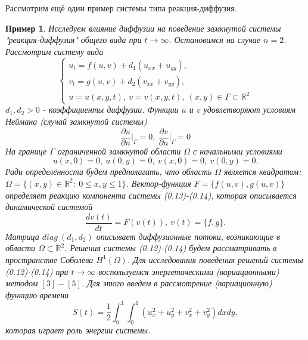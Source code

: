 \documentclass[9pt, a4paper]{extarticle}
\newtheorem{sample}{Пример}
\numberwithin{equation}{section}
\numberwithin{lemma}{section}
\numberwithin{definition}{section}
\numberwithin{notabene}{section}
\numberwithin{corollary}{section}
\begin{document}
	Рассмотрим ещё один пример системы типа реакция-диффузия.
	\begin{sample}
		Исследуем влияние диффузии на поведение замкнутой системы "реакция-диффузия" общего вида при $t \to \infty$. Остановимся на случае $n=2$. Рассмотрим систему вида
		\begin{equation}
			\begin{cases}
				u_t = f(u,v) + d_1 (u_{xx} + u_{yy}), \\
				v_t = g(u,v) + d_2(v_{xx} + v_{yy}), \\
				u = u(x,y,t), \ v = v(x,y,t), \ (x,y) \in \Gamma \subset \mathbb{R}^2
			\end{cases}
		\end{equation}
		$d_1, d_2 > 0$ - коэффициенты диффузии. \newline
		Функции $u$ и $v$ удовлетворяют условиям Неймана (случай замкнутой системы)
		\begin{equation}
			\dfrac{\partial u}{\partial n}\vert_{\Gamma} = 0, \ \dfrac{\partial v}{\partial n}\vert_{\Gamma} = 0
		\end{equation}
		На границе $\Gamma$ ограниченной замкнутой области $\Omega$ с начальными условиями
		\begin{equation}
			u(x,0) = 0, \ u(0,y) = 0, \ v(x,0) = 0, \ v(0,y) = 0.
		\end{equation}
		Ради определённости будем предполагать, что область $\Omega$ является квадратом: $\Omega = \{(x,y) \in \mathbb{R}^2 : \ 0 \leq x,y \leq 1\}$.\newline
		Вектор-функция $F = \{f(u,v), g(u,v)\}$ определяет реакцию компонента системы (0.13)-(0.14), которая описывается динамической системой
		\begin{equation}
			\dfrac{dv(t)}{dt} = F(v(t)), \ v(t) = \{f,g\}.
		\end{equation}
		Матрица $diag\ (d_1, d_2)$ описывает диффузионные потоки, возникающие в области $\Omega \subset \mathbb{R}^2$. Решения системы (0.12)-(0.14) будем рассматривать в пространстве Соболева $H^1(\Omega)$.\newline
		Для исследования поведения решений системы (0.12)-(0.14) при $t \to \infty$ воспользуемся энергетическими (вариационными) методом $[3]-[5]$. Для этого введем в рассмотрение (вариационную) функцию времени
		\begin{equation}
			S(t) = \dfrac12 \int_0^1 \int_0^1 \left(u_x^2 + u_y^2 + v_x^2 + v_y^2\right) dx dy, 
		\end{equation}
		которая играет роль энергии системы.\newline

\end{sample}
\end{document}
